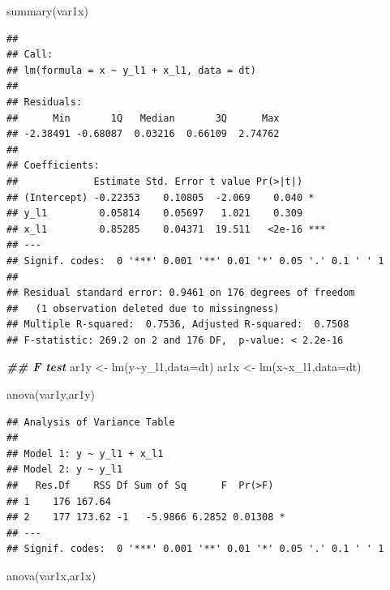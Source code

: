 \documentclass[
  12pt,
  oneside]{book}
\newenvironment{Shaded}{\begin{snugshade}}{\end{snugshade}}
\newcommand{\AttributeTok}[1]{\textcolor[rgb]{0.77,0.63,0.00}{#1}}
\newcommand{\DocumentationTok}[1]{\textcolor[rgb]{0.56,0.35,0.01}{\textbf{\textit{#1}}}}
\newcommand{\FunctionTok}[1]{\textcolor[rgb]{0.00,0.00,0.00}{#1}}
\newcommand{\NormalTok}[1]{#1}
\newcommand{\OtherTok}[1]{\textcolor[rgb]{0.56,0.35,0.01}{#1}}
\newcommand{\SpecialCharTok}[1]{\textcolor[rgb]{0.00,0.00,0.00}{#1}}
\begin{document}
\begin{Shaded}
\begin{Highlighting}[]
\FunctionTok{summary}\NormalTok{(var1x)}
\end{Highlighting}
\end{Shaded}

\begin{verbatim}
## 
## Call:
## lm(formula = x ~ y_l1 + x_l1, data = dt)
## 
## Residuals:
##      Min       1Q   Median       3Q      Max 
## -2.38491 -0.68087  0.03216  0.66109  2.74762 
## 
## Coefficients:
##             Estimate Std. Error t value Pr(>|t|)    
## (Intercept) -0.22353    0.10805  -2.069    0.040 *  
## y_l1         0.05814    0.05697   1.021    0.309    
## x_l1         0.85285    0.04371  19.511   <2e-16 ***
## ---
## Signif. codes:  0 '***' 0.001 '**' 0.01 '*' 0.05 '.' 0.1 ' ' 1
## 
## Residual standard error: 0.9461 on 176 degrees of freedom
##   (1 observation deleted due to missingness)
## Multiple R-squared:  0.7536, Adjusted R-squared:  0.7508 
## F-statistic: 269.2 on 2 and 176 DF,  p-value: < 2.2e-16
\end{verbatim}

\begin{Shaded}
\begin{Highlighting}[]
\DocumentationTok{\#\# F test}
\NormalTok{ar1y }\OtherTok{\textless{}{-}} \FunctionTok{lm}\NormalTok{(y}\SpecialCharTok{\textasciitilde{}}\NormalTok{y\_l1,}\AttributeTok{data=}\NormalTok{dt)}
\NormalTok{ar1x }\OtherTok{\textless{}{-}} \FunctionTok{lm}\NormalTok{(x}\SpecialCharTok{\textasciitilde{}}\NormalTok{x\_l1,}\AttributeTok{data=}\NormalTok{dt)}

\FunctionTok{anova}\NormalTok{(var1y,ar1y)}
\end{Highlighting}
\end{Shaded}

\begin{verbatim}
## Analysis of Variance Table
## 
## Model 1: y ~ y_l1 + x_l1
## Model 2: y ~ y_l1
##   Res.Df    RSS Df Sum of Sq      F  Pr(>F)  
## 1    176 167.64                              
## 2    177 173.62 -1   -5.9866 6.2852 0.01308 *
## ---
## Signif. codes:  0 '***' 0.001 '**' 0.01 '*' 0.05 '.' 0.1 ' ' 1
\end{verbatim}

\begin{Shaded}
\begin{Highlighting}[]
\FunctionTok{anova}\NormalTok{(var1x,ar1x)}
\end{Highlighting}
\end{Shaded}
\end{document}
